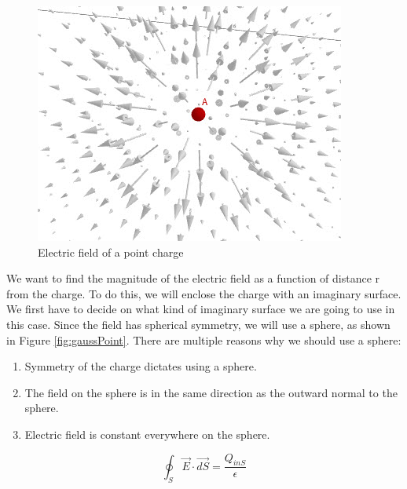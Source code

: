 \documentclass{ximera}
\begin{document}
\begin{figure}[!ht]
\begin{center}
\includegraphics[scale=1]{../jpg/pointChargeField.jpg}
\end{center}
\caption{Electric field of a point charge}
\label{fig:eField}
\end{figure}




We want to find the magnitude of the electric field as a function of distance r from the charge. To do this, we will enclose the charge with an imaginary surface. We first have to decide on what kind of imaginary surface we are going to use in this case. Since the field has spherical symmetry, we will use a sphere, as shown in Figure \ref{fig:gaussPoint}. There are multiple reasons why we should use a sphere:

\begin{enumerate}
\item Symmetry of the charge dictates using a sphere.
\item The field on the sphere is in the same direction as the outward normal to the sphere.
\item Electric field is constant everywhere on the sphere.
\end{enumerate}




\begin{equation}
\oint_S \vec{E} \cdot \vec{dS} = \frac{Q_{inS}}{\epsilon}
\end{equation}
\end{document}

